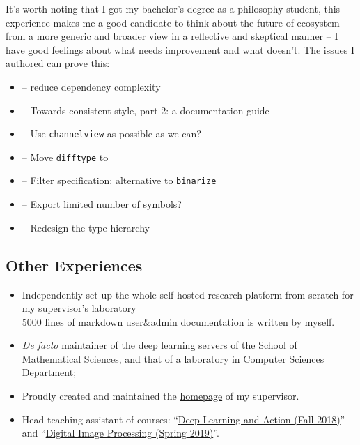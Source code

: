 It's worth noting that I got my bachelor's degree as a philosophy student, this experience makes me a good candidate to think about the future of \images{} ecosystem from a more generic and broader view in a reflective and skeptical manner -- I have good feelings about what needs improvement and what doesn't. The issues I authored can prove this:
\begin{itemize}
  \item {} -- reduce \images{} dependency complexity
  \item {} -- Towards consistent style, part 2: a documentation guide
  \item {} -- Use \texttt{channelview} as possible as we can?
  \item {} -- Move \texttt{difftype} to \imagecore
  \item {} -- Filter specification: alternative to \texttt{binarize}
  \item {} -- Export limited number of symbols?
  \item {} -- Redesign the type hierarchy
\end{itemize}

\subsection*{Other Experiences}
  \begin{itemize}
      \item Independently set up the whole self-hosted research platform from scratch for my supervisor's laboratory\\
        {\small
        5000 lines of markdown user\&admin documentation is written by myself.
        }
      \item \textit{De facto} maintainer of the deep learning servers of the School of Mathematical Sciences, and that of a laboratory in Computer Sciences Department;
      \item Proudly created and maintained the \href{http://math.ecnu.edu.cn/~fli/}{homepage} of my supervisor.
      \item Head teaching assistant of courses: ``\href{http://math.ecnu.edu.cn/~fli/Teaching/DeepLearning/Fall2018/index.html}{Deep Learning and Action (Fall 2018)}''  and ``\href{http://math.ecnu.edu.cn/~fli/Teaching/DigitalImageProcessing/Spring2019/index.html}{Digital Image Processing (Spring 2019)}''.
  \end{itemize}


